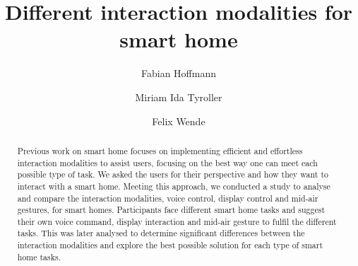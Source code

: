 \documentclass[sigchi]{acmart}
\begin{document}
\title{Different interaction modalities for smart home}

\author{Fabian Hoffmann}

\author{Miriam Ida Tyroller}

\author{Felix Wende}

\renewcommand{\shortauthors}{Trovato and Tobin, et al.}

\begin{abstract}
Previous work on smart home focuses on implementing efficient and effortless interaction modalities to assist users, focusing on the best way one can meet each possible type of task. We asked the users for their perspective and how they want to interact with a smart home. Meeting this approach, we conducted a study to analyse and compare the interaction modalities, voice control, display control and mid-air gestures, for smart homes. Participants face different smart home tasks and suggest their own voice command, display interaction and mid-air gesture to fulfil the different tasks. This was later analysed to determine significant differences between the interaction modalities and explore the best possible solution for each type of smart home tasks.
\end{abstract}

\end{document}
